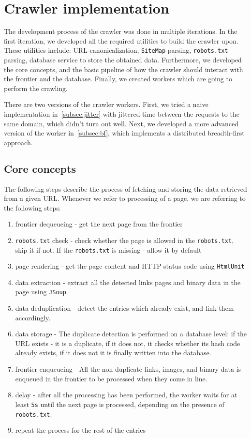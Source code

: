 \documentclass{article}
\begin{document}
\section{Crawler implementation}

The development process of the crawler was done in multiple iterations. In the first iteration, we developed all the required utilities to build the crawler upon. These utilities include: URL-canonicalization, \texttt{SiteMap} parsing, \texttt{robots.txt} parsing, database service to store the obtained data. Furthermore, we developed the core concepts, and the basic pipeline of how the crawler should interact with the frontier and the database. Finally, we created workers which are going to perform the crawling.

There are two versions of the crawler workers. First, we tried a naive implementation in~\ref{subsec:jitter} with jittered time between the requests to the same domain, which didn't turn out well. Next, we developed a more advanced version of the worker in~\ref{subsec:bf}, which implements a distributed breadth-first approach.

\subsection{Core concepts}

The following steps describe the process of fetching and storing the data retrieved from a given URL. Whenever we refer to processing of a page, we are referring to the following steps:
\begin{enumerate}
	\item frontier dequeueing - get the next page from the frontier
	\item \texttt{robots.txt} check - check whether the page is allowed in the \texttt{robots.txt}, skip it if not. If the \texttt{robots.txt} is missing - allow it by default
	\item page rendering - get the page content and HTTP status code using \texttt{HtmlUnit}
	\item data extraction - extract all the detected links pages and binary data in the page using \texttt{JSoup}
	\item data deduplication - detect the entries which already exist, and link them accordingly. 
	\item data storage - The duplicate detection is performed on a database level: if the URL exists - it is a duplicate, if it does not, it checks whether its hash code already exists, if it does not it is finally written into the database.
	\item frontier enqueueing - All the non-duplicate links, images, and binary data is enqueued in the frontier to be processed when they come in line.
	\item delay - after all the processing has been performed, the worker waits for at least \texttt{5s} until the next page is processed, depending on the presence of \texttt{robots.txt}.
	\item repeat the process for the rest of the entries
\end{enumerate}
\end{document}
